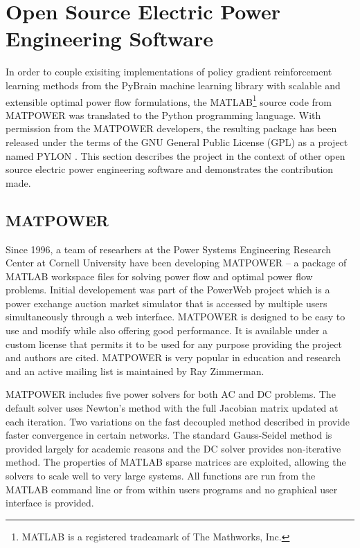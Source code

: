 \section{Open Source Electric Power Engineering Software}
\label{sec:oss}
In order to couple exisiting implementations of policy gradient reinforcement
learning methods from the PyBrain machine learning library with scalable and
extensible optimal power flow formulations, the
MATLAB\footnote{MATLAB is a registered tradeamark of The Mathworks, Inc.}
source code from MATPOWER was translated to the Python programming language.
With permission from the MATPOWER developers, the resulting package has been
released under the terms of the GNU General Public License (GPL) as a project
named PYLON \cite{lincoln:pyreto}.   This section describes the project in the
context of other open source electric power engineering software and
demonstrates the contribution made.

\subsection{MATPOWER}
Since 1996, a team of researhers at the Power Systems Engineering Research
Center at Cornell University have been developing MATPOWER -- a package of
MATLAB workspace files for solving power flow and optimal power flow problems.
Initial developement was part of the PowerWeb project which is a power
exchange auction market simulator that is accessed by multiple users
simultaneously through a web interface.  MATPOWER is designed to be easy to use
and modify while also offering good performance.  It is available under a
custom license that permits it to be used for any purpose providing the project
and authors are cited.  MATPOWER is very popular in education and research and
an active mailing list is maintained by Ray Zimmerman.

MATPOWER includes five power solvers for both AC and DC problems.  The default
solver uses Newton's method \cite{tinney:67} with the full Jacobian matrix
updated at each iteration.  Two variations on the fast decoupled method
\cite{stott:74} described in \cite{amerongen:89} provide faster convergence in
certain networks.  The standard Gauss-Seidel method \cite{glimn:57} is provided
largely for academic reasons and the DC solver provides non-iterative
method.  The properties of MATLAB sparse matrices are exploited, allowing the
solvers to scale well to very large systems.  All functions are run from the
MATLAB command line or from within users programs and no graphical user
interface is provided.

